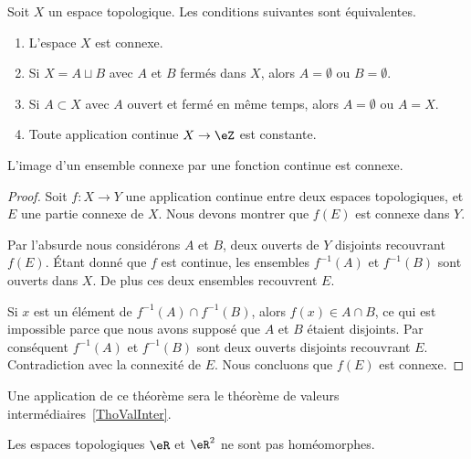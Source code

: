 \begin{proposition} \label{PropHSjJcIr}
    Soit \( X\) un espace topologique. Les conditions suivantes sont équivalentes.
    \begin{enumerate}
        \item
            L'espace \( X\) est connexe.
        \item
            Si \( X=A\sqcup B\) avec \( A\) et \( B\) fermés dans \( X\), alors \( A=\emptyset\) ou \( B=\emptyset\).
        \item       \label{ITEMooNIPZooIDPmEf}
            Si \( A\subset X\) avec \( A\) ouvert et fermé en même temps, alors \( A=\emptyset\) ou \( A=X\).
        \item
            Toute application continue \( X\to \eZ\) est constante.
    \end{enumerate}
\end{proposition}

\begin{proposition}\label{PropGWMVzqb}
    L'image d'un ensemble connexe par une fonction continue est connexe.
\end{proposition}

\begin{proof}
    Soit \( f\colon X\to Y\) une application continue entre deux espaces topologiques, et \( E\) une partie connexe de \( X\). Nous devons montrer que \( f(E)\) est connexe dans \( Y\).

    Par l'absurde nous considérons \( A\) et \( B\), deux ouverts de \( Y\) disjoints recouvrant \( f(E)\). Étant donné que \( f\) est continue, les ensembles \( f^{-1}(A)\) et \( f^{-1}(B)\) sont ouverts dans \( X\). De plus ces deux ensembles recouvrent \( E\).

    Si \( x\) est un élément de \( f^{-1}(A)\cap f^{-1}(B)\), alors \( f(x)\in A\cap B\), ce qui est impossible parce que nous avons supposé que \( A\) et \( B\) étaient disjoints. Par conséquent \( f^{-1}(A)\) et \( f^{-1}(B)\) sont deux ouverts disjoints recouvrant \( E\). Contradiction avec la connexité de \( E\). Nous concluons que \( f(E)\) est connexe.
\end{proof}
Une application de ce théorème sera le théorème de valeurs intermédiaires~\ref{ThoValInter}.


\begin{example}
    Les espaces topologiques \( \eR\) et \( \eR^2\) ne sont pas homéomorphes.
\end{example}

